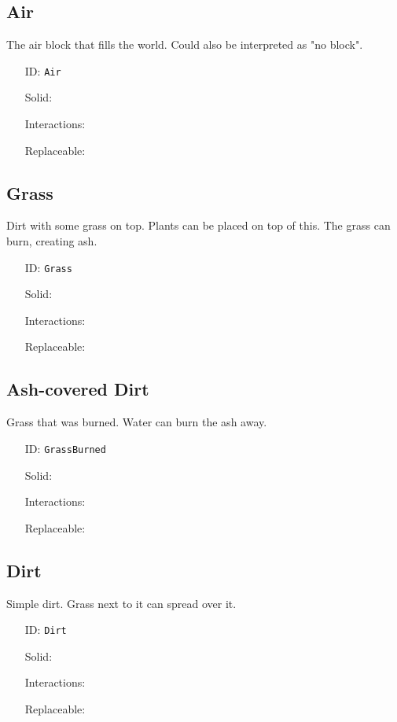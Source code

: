 \subsection{Air}\label{subsec:blocks_air}
The air block that fills the world. Could also be interpreted as "no block".
\newline
\begin{itemize}[nosep]
\item[ID:] \texttt{Air}
\item[Solid:]  \XSolidBrush \item[Interactions:]  \XSolidBrush \item[Replaceable:]  \Checkmark \end{itemize}

\subsection{Grass}\label{subsec:blocks_grass}
Dirt with some grass on top. Plants can be placed on top of this.
                The grass can burn, creating ash.
\newline
\begin{itemize}[nosep]
\item[ID:] \texttt{Grass}
\item[Solid:]  \Checkmark \item[Interactions:]  \XSolidBrush \item[Replaceable:]  \XSolidBrush \end{itemize}

\subsection{Ash-covered Dirt}\label{subsec:blocks_ash-covered dirt}
Grass that was burned. Water can burn the ash away.
\newline
\begin{itemize}[nosep]
\item[ID:] \texttt{GrassBurned}
\item[Solid:]  \Checkmark \item[Interactions:]  \XSolidBrush \item[Replaceable:]  \XSolidBrush \end{itemize}

\subsection{Dirt}\label{subsec:blocks_dirt}
Simple dirt. Grass next to it can spread over it.
\newline
\begin{itemize}[nosep]
\item[ID:] \texttt{Dirt}
\item[Solid:]  \Checkmark \item[Interactions:]  \XSolidBrush \item[Replaceable:]  \XSolidBrush \end{itemize}

